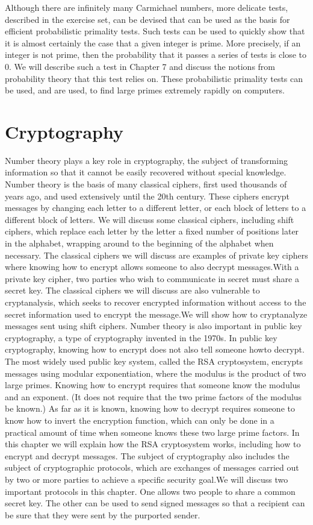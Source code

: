 Although there are infinitely many Carmichael numbers, more delicate tests, described in
the exercise set, can be devised that can be used as the basis for efficient probabilistic primality
tests. Such tests can be used to quickly show that it is almost certainly the case that a given
integer is prime. More precisely, if an integer is not prime, then the probability that it passes a
series of tests is close to 0. We will describe such a test in Chapter 7 and discuss the notions
from probability theory that this test relies on. These probabilistic primality tests can be used,
and are used, to find large primes extremely rapidly on computers.

\section{Cryptography}
Number theory plays a key role in cryptography, the subject of transforming information so that
it cannot be easily recovered without special knowledge. Number theory is the basis of many
classical ciphers, first used thousands of years ago, and used extensively until the 20th century.
These ciphers encrypt messages by changing each letter to a different letter, or each block of
letters to a different block of letters. We will discuss some classical ciphers, including shift
ciphers, which replace each letter by the letter a fixed number of positions later in the alphabet,
wrapping around to the beginning of the alphabet when necessary. The classical ciphers we will
discuss are examples of private key ciphers where knowing how to encrypt allows someone to
also decrypt messages.With a private key cipher, two parties who wish to communicate in secret
must share a secret key. The classical ciphers we will discuss are also vulnerable to cryptanalysis,
which seeks to recover encrypted information without access to the secret information used to
encrypt the message.We will show how to cryptanalyze messages sent using shift ciphers.
Number theory is also important in public key cryptography, a type of cryptography invented
in the 1970s. In public key cryptography, knowing how to encrypt does not also tell someone
howto decrypt. The most widely used public key system, called the RSA cryptosystem, encrypts
messages using modular exponentiation, where the modulus is the product of two large primes.
Knowing how to encrypt requires that someone know the modulus and an exponent. (It does
not require that the two prime factors of the modulus be known.) As far as it is known, knowing
how to decrypt requires someone to know how to invert the encryption function, which can only
be done in a practical amount of time when someone knows these two large prime factors. In
this chapter we will explain how the RSA cryptosystem works, including how to encrypt and
decrypt messages.
The subject of cryptography also includes the subject of cryptographic protocols, which are
exchanges of messages carried out by two or more parties to achieve a specific security goal.We
will discuss two important protocols in this chapter. One allows two people to share a common
secret key. The other can be used to send signed messages so that a recipient can be sure that
they were sent by the purported sender.

